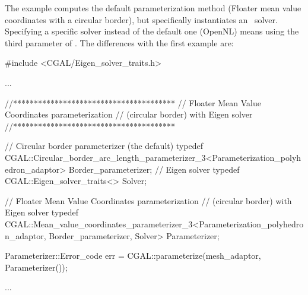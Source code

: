 The example  computes the
default parameterization method (Floater mean value coordinates with a circular border),
but specifically instantiates an \eigen\ solver. Specifying a specific solver
instead of the default one (OpenNL) means using the third parameter of
.  The differences with the first
example  are:

\begin{ccExampleCode}

#include <CGAL/Eigen_solver_traits.h>

...

//***************************************
// Floater Mean Value Coordinates parameterization
// (circular border) with Eigen solver
//***************************************

// Circular border parameterizer (the default)
typedef CGAL::Circular_border_arc_length_parameterizer_3<Parameterization_polyhedron_adaptor>
                                                    Border_parameterizer;
// Eigen solver
typedef CGAL::Eigen_solver_traits<>                 Solver;

// Floater Mean Value Coordinates parameterization
// (circular border) with Eigen solver
typedef CGAL::Mean_value_coordinates_parameterizer_3<Parameterization_polyhedron_adaptor,
                                                        Border_parameterizer,
                                                        Solver>
                                                    Parameterizer;

Parameterizer::Error_code err = CGAL::parameterize(mesh_adaptor, Parameterizer());

...

\end{ccExampleCode}

